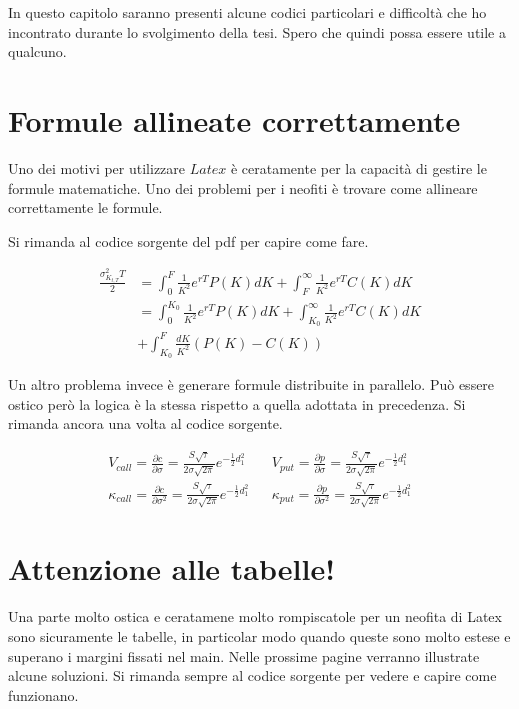 In questo capitolo saranno presenti alcune codici particolari e difficoltà che ho incontrato durante lo svolgimento della tesi. Spero che quindi possa essere utile a qualcuno.

\section{Formule allineate correttamente}

Uno dei motivi per utilizzare $Latex$ è ceratamente per la capacità di gestire le formule matematiche. Uno dei problemi per i neofiti è trovare come allineare correttamente le formule.

Si rimanda al codice sorgente del pdf per capire come fare. 

\begin{align}
\frac{\sigma^2_{K_{t,T}}T}{2}&=\int_{0}^{F}\frac{1}{K^2}e^{rT}P(K)dK + \int_{F}^{\infty}\frac{1}{K^2}e^{rT}C(K)dK \nonumber \\ &=\int_{0}^{K_0}\frac{1}{K^2}e^{rT}P(K)dK + \int_{K_0}^{\infty}\frac{1}{K^2}e^{rT}C(K)dK \nonumber \\ &+ \int_{K_0}^{F}\frac{dK}{K^2}(P(K)-C(K))
\end{align}

\bigskip

Un altro problema invece è generare formule distribuite in parallelo. Può essere ostico però la logica è la stessa rispetto a quella adottata in precedenza. Si rimanda ancora una volta al codice sorgente.

\begin{align}
V_{call}=\frac{\partial c}{\partial \sigma}=\frac{S \sqrt{\tau}}{2\sigma\sqrt{2\pi}}e^{-\frac{1}{2}d^2_1} &&  V_{put}=\frac{\partial p}{\partial \sigma}=\frac{S \sqrt{\tau}}{2\sigma\sqrt{2\pi}}e^{-\frac{1}{2}d^2_1} \nonumber \\ \kappa_{call}=\frac{\partial c}{\partial \sigma^2}=\frac{S\sqrt{\tau}}{2\sigma\sqrt{2\pi}}e^{-\frac{1}{2}d_1^2} && \kappa_{put}=\frac{\partial p}{\partial \sigma^2}=\frac{S\sqrt{\tau}}{2\sigma\sqrt{2\pi}}e^{-\frac{1}{2}d_1^2}
\end{align}

\bigskip

\section{Attenzione alle tabelle!}

Una parte molto ostica e ceratamene molto rompiscatole per un neofita di Latex sono sicuramente le tabelle, in particolar modo quando queste sono molto estese e superano i margini fissati nel main. Nelle prossime pagine verranno illustrate alcune soluzioni. Si rimanda sempre al codice sorgente per vedere e capire come funzionano.

